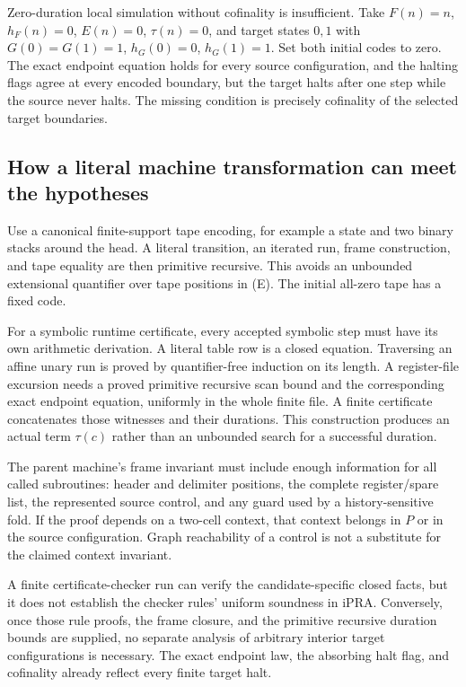 Zero-duration local simulation without cofinality is insufficient. Take
$F(n)=n$, $h_F(n)=0$, $E(n)=0$, $\tau(n)=0$, and target states $0,1$
with $G(0)=G(1)=1$, $h_G(0)=0$, $h_G(1)=1$. Set both initial codes to
zero. The exact endpoint equation holds for every source configuration,
and the halting flags agree at every encoded boundary, but the target
halts after one step while the source never halts. The missing condition
is precisely cofinality of the selected target boundaries.

\subsection{How a literal machine transformation can meet the hypotheses}

Use a canonical finite-support tape encoding, for example a state and two
binary stacks around the head. A literal transition, an iterated run,
frame construction, and tape equality are then primitive recursive. This
avoids an unbounded extensional quantifier over tape positions in (E).
The initial all-zero tape has a fixed code.

For a symbolic runtime certificate, every accepted symbolic step must
have its own arithmetic derivation. A literal table row is a closed
equation. Traversing an affine unary run is proved by quantifier-free
induction on its length. A register-file excursion needs a proved
primitive recursive scan bound and the corresponding exact endpoint
equation, uniformly in the whole finite file. A finite certificate
concatenates those witnesses and their durations. This construction
produces an actual term $\tau(c)$ rather than an unbounded search for a
successful duration.

The parent machine's frame invariant must include enough information for
all called subroutines: header and delimiter positions, the complete
register/spare list, the represented source control, and any guard used by
a history-sensitive fold. If the proof depends on a two-cell context,
that context belongs in $P$ or in the source configuration. Graph
reachability of a control is not a substitute for the claimed context
invariant.

A finite certificate-checker run can verify the candidate-specific closed
facts, but it does not establish the checker rules' uniform soundness in
$\mathrm{iPRA}$. Conversely, once those rule proofs, the frame closure,
and the primitive recursive duration bounds are supplied, no separate
analysis of arbitrary interior target configurations is necessary. The
exact endpoint law, the absorbing halt flag, and cofinality already
reflect every finite target halt.

